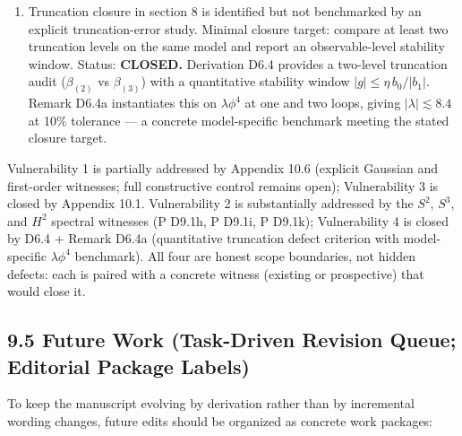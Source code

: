 \documentclass[
]{article}
\begin{document}
\begin{enumerate}
  D8.2a.
\item
  Truncation closure in section 8 is identified but not benchmarked by
  an explicit truncation-error study. Minimal closure target: compare at
  least two truncation levels on the same model and report an
  observable-level stability window. Status: \textbf{CLOSED.} Derivation
  D6.4 provides a two-level truncation audit (\(\beta_{(2)}\) vs
  \(\beta_{(3)}\)) with a quantitative stability window
  \(|g|\le\eta\,b_0/|b_1|\). Remark D6.4a instantiates this on
  \(\lambda\phi^4\) at one and two loops, giving
  \(|\lambda|\lesssim 8.4\) at 10\% tolerance --- a concrete
  model-specific benchmark meeting the stated closure target.
\end{enumerate}

Vulnerability 1 is partially addressed by Appendix 10.6 (explicit
Gaussian and first-order witnesses; full constructive control remains
open); Vulnerability 3 is closed by Appendix 10.1. Vulnerability 2 is
substantially addressed by the \(S^2\), \(S^3\), and \(H^2\) spectral
witnesses (P D9.1h, P D9.1i, P D9.1k); Vulnerability 4 is closed by D6.4
+ Remark D6.4a (quantitative truncation defect criterion with
model-specific \(\lambda\phi^4\) benchmark). All four are honest scope
boundaries, not hidden defects: each is paired with a concrete witness
(existing or prospective) that would close it.

\hypertarget{future-work-task-driven-revision-queue-editorial-package-labels}{%
\subsection{9.5 Future Work (Task-Driven Revision Queue; Editorial
Package
Labels)}\label{future-work-task-driven-revision-queue-editorial-package-labels}}

To keep the manuscript evolving by derivation rather than by incremental
wording changes, future edits should be organized as concrete work
packages:
\end{document}

